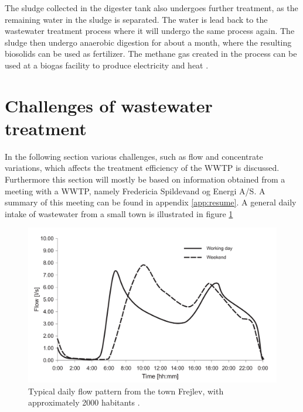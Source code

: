 The sludge collected in the digester tank also undergoes further treatment, as the remaining water in the sludge is separated. The water is lead back to the wastewater treatment process where it will undergo the same process again. The sludge then undergo anaerobic digestion for about a month, where the resulting biosolids can be used as fertilizer. The methane gas created in the process can be used at a biogas facility to produce electricity and heat \cite{wwtp_ekstra}.


\section{Challenges of wastewater treatment}\label{sec:WWTP_challenges}
In the following section various challenges, such as flow and concentrate variations, which affects the treatment efficiency of the WWTP is discussed. 
Furthermore this section will mostly be based on information obtained from a meeting with a WWTP, namely Fredericia Spildevand og Energi A/S. A summary of this meeting can be found in appendix \ref{app:resume}.
A general daily intake of wastewater from a small town is illustrated in figure \ref{fig:input_to_wwtp}  

\begin{figure}[H]
\centering
\includegraphics[width=.6\textwidth]{report/introduction/pictures/poopflow.png}
\caption{Typical daily flow pattern from the town Frejlev, with approximately 2000 habitants \cite{schlutter1999numerical}.}
\label{fig:input_to_wwtp}%
\end{figure} 

